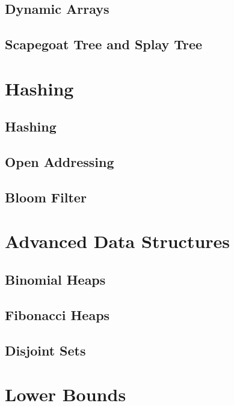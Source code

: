 \documentclass[11pt,fleqn,dvipsnames]{book} %
\begin{document}
\chapter{Dynamic Arrays}


\chapter{Scapegoat Tree and Splay Tree}


\part{Hashing}

\chapter{Hashing}


\chapter{Open Addressing}


\chapter{Bloom Filter}


\part{Advanced Data Structures}

\chapter{Binomial Heaps}


\chapter{Fibonacci Heaps}

\chapter{Disjoint Sets}




\part{Lower Bounds}
\end{document}
